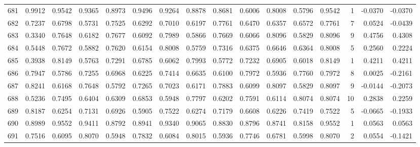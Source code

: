 \begin{tabular}{lrrrrrrrrrrrrrrr}
681 &      0.9912 &  0.9542 &  0.9365 &  0.8973 &  0.9496 &  0.9264 &  0.8878 &  0.8681 &  0.6006 &  0.8008 &   0.5796 &     0.9542 &      1 &                   -0.0370 &                    -0.0370 \\
682 &      0.7237 &  0.6798 &  0.5731 &  0.7525 &  0.6292 &  0.7010 &  0.6197 &  0.7761 &  0.6470 &  0.6357 &   0.6572 &     0.7761 &      7 &                    0.0524 &                    -0.0439 \\
683 &      0.3340 &  0.7648 &  0.6182 &  0.7677 &  0.6092 &  0.7989 &  0.5866 &  0.7669 &  0.6066 &  0.8096 &   0.5829 &     0.8096 &      9 &                    0.4756 &                     0.4308 \\
684 &      0.5448 &  0.7672 &  0.5882 &  0.7620 &  0.6154 &  0.8008 &  0.5759 &  0.7316 &  0.6375 &  0.6646 &   0.6364 &     0.8008 &      5 &                    0.2560 &                     0.2224 \\
685 &      0.3938 &  0.8149 &  0.5763 &  0.7291 &  0.6785 &  0.6062 &  0.7993 &  0.5772 &  0.7232 &  0.6905 &   0.6018 &     0.8149 &      1 &                    0.4211 &                     0.4211 \\
686 &      0.7947 &  0.5786 &  0.7255 &  0.6968 &  0.6225 &  0.7414 &  0.6635 &  0.6100 &  0.7972 &  0.5936 &   0.7760 &     0.7972 &      8 &                    0.0025 &                    -0.2161 \\
687 &      0.8241 &  0.6168 &  0.7648 &  0.5792 &  0.7265 &  0.7023 &  0.6171 &  0.7883 &  0.6099 &  0.8097 &   0.5829 &     0.8097 &      9 &                   -0.0144 &                    -0.2073 \\
688 &      0.5236 &  0.7495 &  0.6404 &  0.6309 &  0.6853 &  0.5948 &  0.7797 &  0.6202 &  0.7591 &  0.6114 &   0.8074 &     0.8074 &     10 &                    0.2838 &                     0.2259 \\
689 &      0.8187 &  0.6254 &  0.7131 &  0.6926 &  0.5905 &  0.7522 &  0.6274 &  0.7179 &  0.6608 &  0.6226 &   0.7419 &     0.7522 &      5 &                   -0.0665 &                    -0.1933 \\
690 &      0.8989 &  0.9552 &  0.9411 &  0.8792 &  0.8941 &  0.9340 &  0.9065 &  0.8830 &  0.8796 &  0.8741 &   0.8158 &     0.9552 &      1 &                    0.0563 &                     0.0563 \\
691 &      0.7516 &  0.6095 &  0.8070 &  0.5948 &  0.7832 &  0.6084 &  0.8015 &  0.5936 &  0.7746 &  0.6781 &   0.5998 &     0.8070 &      2 &                    0.0554 &                    -0.1421 \\

\end{tabular}
